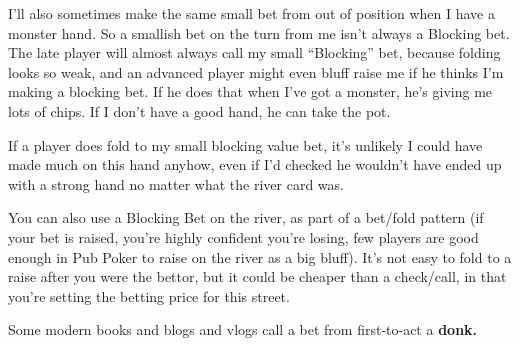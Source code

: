 I'll also sometimes make the same small bet from out of position
when I have a monster hand. So a smallish bet on the turn from me
isn't always a Blocking bet. The late player will almost always call
my small ``Blocking'' bet, because folding looks so weak, and an
advanced player might even bluff raise me if he thinks I'm making
a blocking bet. If he does that when I've got a monster, he's giving
me lots of chips. If I don't have a good hand, he can take the pot.

If a player does fold to my small blocking value bet, it's unlikely
I could have made much on this hand anyhow, even if I'd checked
he wouldn't have ended up with a strong hand no matter what
the river card was.

You can also use a Blocking Bet on the river, as part of a
bet/fold pattern (if your bet is raised, you're highly
confident you're losing, few players are good enough in
Pub Poker to raise on the river as a big bluff). It's not
easy to fold to a raise after you were the bettor, but it could
be cheaper than a check/call, in that you're setting the betting
price for this street.

Some modern books and blogs and vlogs call a bet from
first-to-act a \textbf{donk.}


